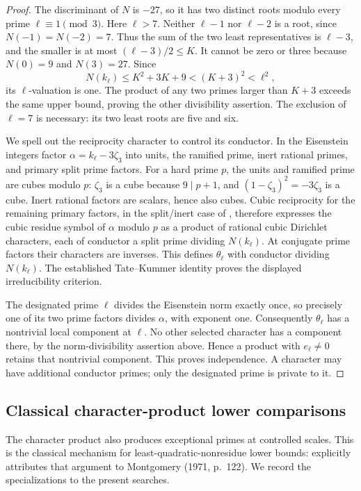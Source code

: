 \documentclass[11pt]{article}
\theoremstyle{definition}
\theoremstyle{remark}
\begin{document}
\begin{proof}
The discriminant of $N$ is $-27$, so it has two distinct roots
modulo every prime $\ell\equiv1\pmod3$.  Here $\ell>7$.
Neither $\ell-1$ nor $\ell-2$ is a root, since $N(-1)=N(-2)=7$.
Thus the sum of the two least representatives is $\ell-3$,
and the smaller is at most $(\ell-3)/2\le K$.
It cannot be zero or three because $N(0)=9$ and $N(3)=27$.
Since
\[
 N(k_\ell)\le K^2+3K+9<(K+3)^2<\ell^2,
\]
its $\ell$-valuation is one.  The product of any two primes
larger than $K+3$ exceeds the same upper bound, proving the
other divisibility assertion.  The exclusion of $\ell=7$ is
necessary: its two least roots are five and six.

We spell out the reciprocity character to control its conductor.
In the Eisenstein integers factor
$\alpha=k_\ell-3\zeta_3$ into units, the ramified prime,
inert rational primes, and primary split prime factors.  For a
hard prime $p$, the units and ramified prime are cubes modulo $p$:
$\zeta_3$ is a cube because $9\mid p+1$, and
$(1-\zeta_3)^2=-3\zeta_3$ is a cube.  Inert rational factors
are scalars, hence also cubes.  Cubic reciprocity for the remaining
primary factors, in the split/inert case of
\cite[p.~395, equation~(1.1), and Section~2, pp.~396--397]{FriesenSpearmanWilliams1986},
therefore expresses the cubic residue symbol of
$\alpha$ modulo $p$ as a product of rational cubic Dirichlet
characters, each of conductor a split prime dividing $N(k_\ell)$.
At conjugate prime factors their characters are inverses.  This
defines $\theta_\ell$ with conductor dividing $N(k_\ell)$.
The established Tate--Kummer identity proves the displayed
irreducibility criterion.

The designated prime $\ell$ divides the Eisenstein norm exactly
once, so precisely one of its two prime factors divides $\alpha$,
with exponent one.  Consequently $\theta_\ell$ has a nontrivial
local component at $\ell$.  No other selected character has a
component there, by the norm-divisibility assertion above.  Hence
a product with $e_\ell\ne0$ retains that nontrivial component.
This proves independence.  A character may have additional
conductor primes; only the designated prime is private to it.
\end{proof}

\subsection{Classical character-product lower comparisons}

The character product also produces exceptional primes at controlled
scales.  This is the classical mechanism for least-quadratic-nonresidue
lower bounds: \cite[p.~432, Exercise~9(a)--(e)]{MontgomeryVaughan2007}
explicitly attributes that argument to Montgomery (1971, p.~122).
We record the specializations to the present searches.
\end{document}
